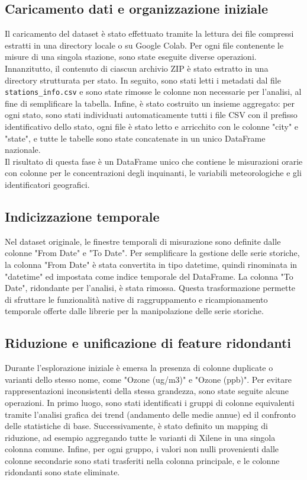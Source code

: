 \documentclass[a4paper,12pt]{report}
\begin{document}
	\subsection{Caricamento dati e organizzazione iniziale}
	Il caricamento del dataset è stato effettuato tramite la lettura dei file compressi estratti in una directory locale o su Google Colab. Per ogni file contenente le misure di una singola stazione, sono state eseguite diverse operazioni. Innanzitutto, il contenuto di ciascun archivio ZIP è stato estratto in una directory strutturata per stato. In seguito, sono stati letti i metadati dal file \texttt{stations\_info.csv} e sono state rimosse le colonne non necessarie per l'analisi, al fine di semplificare la tabella. Infine, è stato costruito un insieme aggregato: per ogni stato, sono stati individuati automaticamente tutti i file CSV con il prefisso identificativo dello stato, ogni file è stato letto e arricchito con le colonne "city" e "state", e tutte le tabelle sono state concatenate in un unico DataFrame nazionale. \\
	Il risultato di questa fase è un DataFrame unico che contiene le misurazioni orarie con colonne per le concentrazioni degli inquinanti, le variabili meteorologiche e gli identificatori geografici.
	
	\subsection{Indicizzazione temporale}
	Nel dataset originale, le finestre temporali di misurazione sono definite dalle colonne "From Date" e "To Date". Per semplificare la gestione delle serie storiche, la colonna "From Date" è stata convertita in tipo datetime, quindi rinominata in "datetime" ed impostata come indice temporale del DataFrame. La colonna "To Date", ridondante per l'analisi, è stata rimossa. Questa trasformazione permette di sfruttare le funzionalità native di raggruppamento e ricampionamento temporale offerte dalle librerie per la manipolazione delle serie storiche.
	
	\subsection{Riduzione e unificazione di feature ridondanti}
	Durante l'esplorazione iniziale è emersa la presenza di colonne duplicate o varianti dello stesso nome, come "Ozone (ug/m3)" e "Ozone (ppb)". Per evitare rappresentazioni inconsistenti della stessa grandezza, sono state seguite alcune operazioni. In primo luogo, sono stati identificati i gruppi di colonne equivalenti tramite l'analisi grafica dei trend (andamento delle medie annue) ed il confronto delle statistiche di base. Successivamente, è stato definito un mapping di riduzione, ad esempio aggregando tutte le varianti di Xilene in una singola colonna comune. Infine, per ogni gruppo, i valori non nulli provenienti dalle colonne secondarie sono stati trasferiti nella colonna principale, e le colonne ridondanti sono state eliminate.
	
\end{document}
